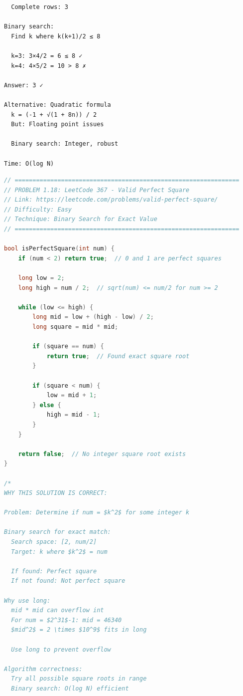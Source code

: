 \documentclass[11pt,a4paper,oneside]{book}
\begin{document}
\begin{tcolorbox}[
    enhanced,breakable,
    colback=lightgray,
    colframe=accentorange,
    boxrule=2pt,
    arc=4mm,
    title=\textbf{Complete Application Patterns}
]
\begin{verbatim}
  Complete rows: 3

Binary search:
  Find k where k(k+1)/2 ≤ 8
  
  k=3: 3×4/2 = 6 ≤ 8 ✓
  k=4: 4×5/2 = 10 > 8 ✗
  
Answer: 3 ✓

Alternative: Quadratic formula
  k = (-1 + √(1 + 8n)) / 2
  But: Floating point issues
  
  Binary search: Integer, robust

Time: O(log N)
\end{verbatim}
\end{tcolorbox}

\begin{lstlisting}[language=C++, caption=Complete Application Solutions]
// ===============================================================
// PROBLEM 1.18: LeetCode 367 - Valid Perfect Square
// Link: https://leetcode.com/problems/valid-perfect-square/
// Difficulty: Easy
// Technique: Binary Search for Exact Value
// ===============================================================

bool isPerfectSquare(int num) {
    if (num < 2) return true;  // 0 and 1 are perfect squares
    
    long low = 2;
    long high = num / 2;  // sqrt(num) <= num/2 for num >= 2
    
    while (low <= high) {
        long mid = low + (high - low) / 2;
        long square = mid * mid;
        
        if (square == num) {
            return true;  // Found exact square root
        }
        
        if (square < num) {
            low = mid + 1;
        } else {
            high = mid - 1;
        }
    }
    
    return false;  // No integer square root exists
}

/*
WHY THIS SOLUTION IS CORRECT:

Problem: Determine if num = $k^2$ for some integer k

Binary search for exact match:
  Search space: [2, num/2]
  Target: k where $k^2$ = num
  
  If found: Perfect square 
  If not found: Not perfect square 

Why use long:
  mid * mid can overflow int
  For num = $2^31$-1: mid = 46340
  $mid^2$ = 2 \times $10^9$ fits in long
  
  Use long to prevent overflow

Algorithm correctness:
  Try all possible square roots in range
  Binary search: O(log N) efficient
  

\end{lstlisting}
\end{document}
